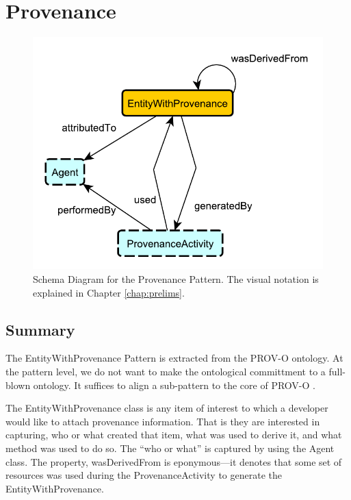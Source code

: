 \section{Provenance}
\label{sec:Provenance}
\begin{figure}[h!]
\begin{center}
\includegraphics[width=.7\textwidth]{figures/provenance}
\end{center}
\caption{Schema Diagram for the Provenance Pattern. The visual notation is explained in Chapter \ref{chap:prelims}.}
\label{fig:Provenance}
\end{figure}
\subsection{Summary}
\label{sum:Provenance}
The \textsf{EntityWithProvenance} Pattern is extracted from the PROV-O ontology. At the pattern level, we do not want to make the ontological committment to a full-blown ontology. It suffices to align a sub-pattern to the core of PROV-O \cite{provo}.

The \textsf{EntityWithProvenance} class is any item of interest to which a developer would like to attach provenance information. That is they are interested in capturing, who or what created that item, what was used to derive it, and what method was used to do so. The ``who or what'' is captured by using the \textsf{Agent} class. The property, \textsf{wasDerivedFrom} is eponymous---it denotes that some set of resources was used during the \textsf{ProvenanceActivity} to generate the \textsf{EntityWithProvenance}.

